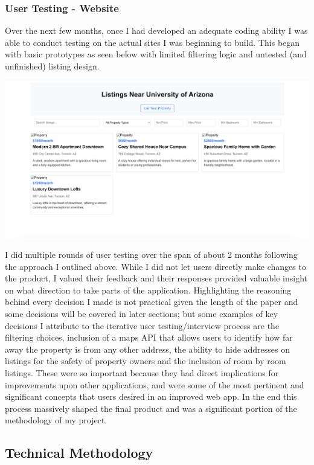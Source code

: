 \documentclass[10pt,twocolumn]{article}
\begin{document}
\subsubsection{User Testing - Website}
Over the next few months, once I had developed an adequate coding ability I was able to conduct testing on the actual sites I was beginning to build. This began with basic prototypes as seen below with limited filtering logic and untested (and unfinished) listing design.\\

\centerline{\includegraphics[scale=.15]{Old Screenshot.png}}

I did multiple rounds of user testing over the span of about 2 months following the approach I outlined above. While I did not let users directly make changes to the product, I valued their feedback and their responses provided valuable insight on what direction to take parts of the application. Highlighting the reasoning behind every decision I made is not practical given the length of the paper and some decisions will be covered in later sections; but some examples of key decisions I attribute to the iterative user testing/interview process are the filtering choices, inclusion of a maps API that allows users to identify how far away the property is from any other address, the ability to hide addresses on listings for the safety of property owners and the inclusion of room by room listings. These were so important because they had direct implications for improvements upon other applications, and were some of the most pertinent and significant concepts that users desired in an improved web app. In the end this process massively shaped the final product and was a significant portion of the methodology of my project.

\subsection{Technical Methodology}
\end{document}
